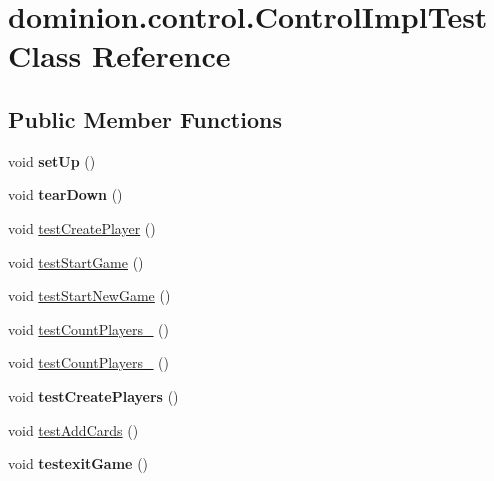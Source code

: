 \hypertarget{classdominion_1_1control_1_1ControlImplTest}{\section{dominion.\-control.\-Control\-Impl\-Test \-Class \-Reference}
\label{classdominion_1_1control_1_1ControlImplTest}
}
\subsection*{\-Public \-Member \-Functions}
\begin{DoxyCompactItemize}
\item 
\hypertarget{classdominion_1_1control_1_1ControlImplTest_a6f402717da5eb4767ce936b64aa32880}{void {\bfseries set\-Up} ()}\label{classdominion_1_1control_1_1ControlImplTest_a6f402717da5eb4767ce936b64aa32880}

\item 
\hypertarget{classdominion_1_1control_1_1ControlImplTest_a4cd7dacd1ded061183d95d36fd30ade1}{void {\bfseries tear\-Down} ()}\label{classdominion_1_1control_1_1ControlImplTest_a4cd7dacd1ded061183d95d36fd30ade1}

\item 
void \hyperlink{classdominion_1_1control_1_1ControlImplTest_ae929035ce04468cba540b981e2e073c5}{test\-Create\-Player} ()
\item 
void \hyperlink{classdominion_1_1control_1_1ControlImplTest_ae0b66b8e8f47905b30bd75ec2858e78a}{test\-Start\-Game} ()
\item 
void \hyperlink{classdominion_1_1control_1_1ControlImplTest_a88656c1a74f831fec05070ae583eda18}{test\-Start\-New\-Game} ()
\item 
void \hyperlink{classdominion_1_1control_1_1ControlImplTest_aa2bbf1c32a25dfc608bd4d872cbdcc9f}{test\-Count\-Players\-\_} ()
\item 
void \hyperlink{classdominion_1_1control_1_1ControlImplTest_aea17141ac5949d3c03f0bb99bfd09ca9}{test\-Count\-Players\-\_} ()
\item 
\hypertarget{classdominion_1_1control_1_1ControlImplTest_a8d78fc9f6fdf8c6dc2c276d5cb9c1cd1}{void {\bfseries test\-Create\-Players} ()}\label{classdominion_1_1control_1_1ControlImplTest_a8d78fc9f6fdf8c6dc2c276d5cb9c1cd1}

\item 
void \hyperlink{classdominion_1_1control_1_1ControlImplTest_aa73f99e0f6783d777878705cc5695764}{test\-Add\-Cards} ()
\item 
\hypertarget{classdominion_1_1control_1_1ControlImplTest_aec4ecec4935d8045b1074979be57b592}{void {\bfseries testexit\-Game} ()}\label{classdominion_1_1control_1_1ControlImplTest_aec4ecec4935d8045b1074979be57b592}


\end{DoxyCompactItemize}
